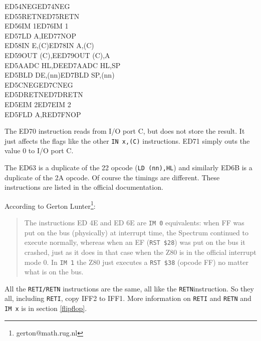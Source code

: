 \documentclass[oneside,a4paper]{book}
\begin{document}
{\begin{tabbing}
		{\qquad}ED54\>NEG{\footnotemark[7]}\>ED74\>NEG{\footnotemark[7]}\\
		{\qquad}ED55\>RETN{\footnotemark[7]}\>ED75\>RETN{\footnotemark[7]}\\
		{\qquad}ED56\>IM 1\>ED76\>IM 1{\footnotemark[7]}\\
		{\qquad}ED57\>LD A,I\>ED77\>NOP{\footnotemark[7]}\\
		{\qquad}ED58\>IN E,(C)\>ED78\>IN A,(C)\\
		{\qquad}ED59\>OUT (C),E\>ED79\>OUT (C),A\\
		{\qquad}ED5A\>ADC HL,DE\>ED7A\>ADC HL,SP\\
		{\qquad}ED5B\>LD DE,(nn)\>ED7B\>LD SP,(nn)\\
		{\qquad}ED5C\>NEG{\footnotemark[7]}\>ED7C\>NEG{\footnotemark[7]}\\
		{\qquad}ED5D\>RETN{\footnotemark[7]}\>ED7D\>RETN{\footnotemark[7]}\\
		{\qquad}ED5E\>IM 2\>ED7E\>IM 2{\footnotemark[7]}\\
		{\qquad}ED5F\>LD A,R\>ED7F\>NOP{\footnotemark[7]}\\
	\end{tabbing}
}
\renewcommand{\thefootnote}{\arabic{footnote}}

The ED70 instruction reads from I/O port C, but does not store the result. It just affects the flags like the other {\tt IN x,(C)} instructions. ED71 simply outs the value 0 to I/O port C.

The ED63 is a duplicate of the 22 opcode ({\tt LD (nn),HL}) and similarly ED6B is a duplicate of the 2A opcode. Of course the timings are different. These instructions are listed in the official documentation.

According to Gerton Lunter\footnote{gerton@math.rug.nl}:

\begin{quote}
	The instructions ED 4E and ED 6E are {\tt IM 0} equivalents: when FF was put on the bus (physically) at interrupt time, the Spectrum continued to execute normally, whereas when an EF ({\tt RST \$28}) was put on the bus it crashed, just as it does in that case when the Z80 is in the official interrupt mode 0. In {\tt IM 1} the Z80 just executes a {\tt RST \$38} (opcode FF) no matter what is on the bus.
\end{quote}

All the {\tt RETI/RETN} instructions are the same, all like the {\tt RETN}instruction. So they all, including {\tt RETI}, copy IFF2 to IFF1. More information on {\tt RETI} and {\tt RETN} and {\tt IM x} is in section \ref{flipflop}.
\end{document}
